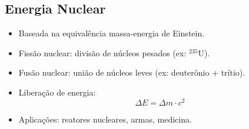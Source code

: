 \documentclass[a4paper,12pt]{article}
\newcommand{\printingbibliography}{%

    \pagestyle{myheadings}
    \markright{}
    \sloppy
    \printbibliography[heading=bibintoc, %
                   title=Refer\^encias %
                  ]
    \fussy%
}
\begin{document}
\begin{multicols}{2}
\section{Energia Nuclear}
\begin{itemize}
    \item Baseada na equivalência massa-energia de Einstein.
    \item Fissão nuclear: divisão de núcleos pesados (ex: $^{235}$U).
    \item Fusão nuclear: união de núcleos leves (ex: deuterônio + trítio).
    \item Liberação de energia:
    \[
        \Delta E = \Delta m \cdot c^2
    \]
    \item Aplicações: reatores nucleares, armas, medicina.
\end{itemize}

\end{multicols}

\end{document}
